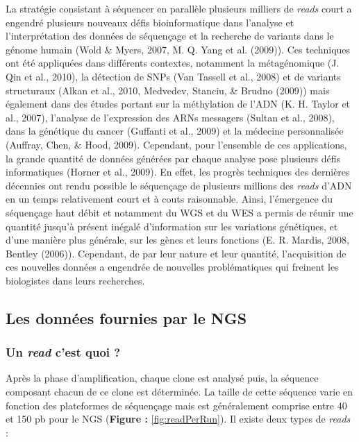 \documentclass[12pt,twoside]{reedthesis}
\theoremstyle{definition}
\theoremstyle{definition}
\theoremstyle{remark}
\begin{document}
  La stratégie consistant à séquencer en parallèle plusieurs milliers de
  \emph{reads} court a engendré plusieurs nouveaux défis bioinformatique
  dans l'analyse et l'interprétation des données de séquençage et la
  recherche de variants dans le génome humain (Wold \& Myers, 2007, M. Q.
  Yang et al. (2009)). Ces techniques ont été appliquées dans différents
  contextes, notamment la métagénomique (J. Qin et al., 2010), la
  détection de SNPs (Van Tassell et al., 2008) et de variants structuraux
  (Alkan et al., 2010, Medvedev, Stanciu, \& Brudno (2009)) mais également
  dans des études portant sur la méthylation de l'ADN (K. H. Taylor et
  al., 2007), l'analyse de l'expression des ARNs messagers (Sultan et al.,
  2008), dans la génétique du cancer (Guffanti et al., 2009) et la
  médecine personnalisée (Auffray, Chen, \& Hood, 2009). Cependant, pour
  l'ensemble de ces applications, la grande quantité de données générées
  par chaque analyse pose plusieurs défis informatiques (Horner et al.,
  2009). En effet, les progrès techniques des dernières décennies ont
  rendu possible le séquençage de plusieurs millions des \emph{reads}
  d'ADN en un temps relativement court et à couts raisonnable. Ainsi,
  l'émergence du séquençage haut débit et notamment du WGS et du WES a
  permis de réunir une quantité jusqu'à présent inégalé d'information sur
  les variations génétiques, et d'une manière plus générale, sur les gènes
  et leurs fonctions (E. R. Mardis, 2008, Bentley (2006)). Cependant, de
  par leur nature et leur quantité, l'acquisition de ces nouvelles données
  a engendrée de nouvelles problématiques qui freinent les biologistes
  dans leurs recherches.
  
  \subsection{Les données fournies par le
  NGS}\label{les-donnees-fournies-par-le-ngs}
  
  \subsubsection{\texorpdfstring{Un \emph{read} c'est quoi
  ?}{Un read c'est quoi ?}}\label{un-read-cest-quoi}
  
  Après la phase d'amplification, chaque clone est analysé puis, la
  séquence composant chacun de ce clone est déterminée. La taille de cette
  séquence varie en fonction des plateformes de séquençage mais est
  généralement comprise entre 40 et 150 pb pour le NGS (\textbf{Figure :
  }\ref{fig:readPerRun}). Il existe deux types de \emph{reads} :
  
\end{document}
